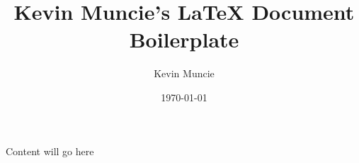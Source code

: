 \documentclass[a4paper,12pt]{article}
\begin{document}
\title{Kevin Muncie's LaTeX Document Boilerplate}
\author{Kevin Muncie}
\date{\today}
\maketitle

Content will go here
\end{document}

